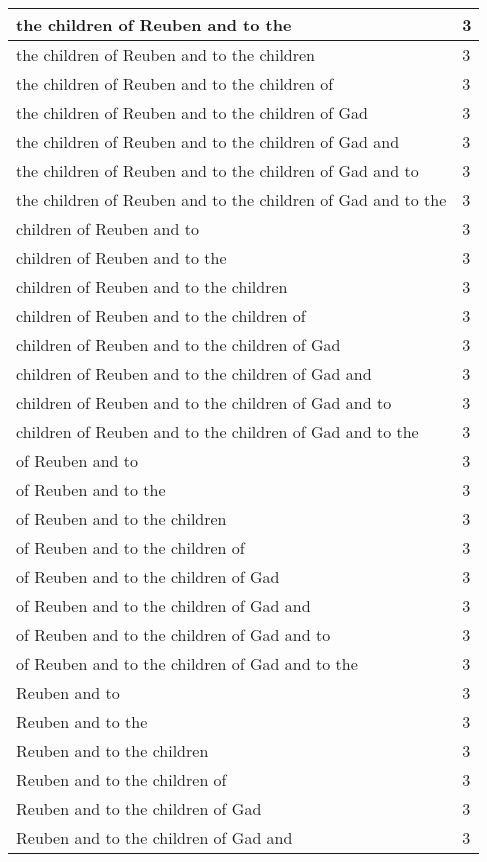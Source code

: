 \begin{center}
\begin{longtable}{|p{3.0in}|p{0.5in}|}
the children of Reuben and to the & 3\\ \hline 
the children of Reuben and to the children & 3\\ \hline 
the children of Reuben and to the children of & 3\\ \hline 
the children of Reuben and to the children of Gad & 3\\ \hline 
the children of Reuben and to the children of Gad and & 3\\ \hline 
the children of Reuben and to the children of Gad and to & 3\\ \hline 
the children of Reuben and to the children of Gad and to the & 3\\ \hline 
children of Reuben and to & 3\\ \hline 
children of Reuben and to the & 3\\ \hline 
children of Reuben and to the children & 3\\ \hline 
children of Reuben and to the children of & 3\\ \hline 
children of Reuben and to the children of Gad & 3\\ \hline 
children of Reuben and to the children of Gad and & 3\\ \hline 
children of Reuben and to the children of Gad and to & 3\\ \hline 
children of Reuben and to the children of Gad and to the & 3\\ \hline 
of Reuben and to & 3\\ \hline 
of Reuben and to the & 3\\ \hline 
of Reuben and to the children & 3\\ \hline 
of Reuben and to the children of & 3\\ \hline 
of Reuben and to the children of Gad & 3\\ \hline 
of Reuben and to the children of Gad and & 3\\ \hline 
of Reuben and to the children of Gad and to & 3\\ \hline 
of Reuben and to the children of Gad and to the & 3\\ \hline 
Reuben and to & 3\\ \hline 
Reuben and to the & 3\\ \hline 
Reuben and to the children & 3\\ \hline 
Reuben and to the children of & 3\\ \hline 
Reuben and to the children of Gad & 3\\ \hline 
Reuben and to the children of Gad and & 3\\ \hline 

\end{longtable}
\end{center}
